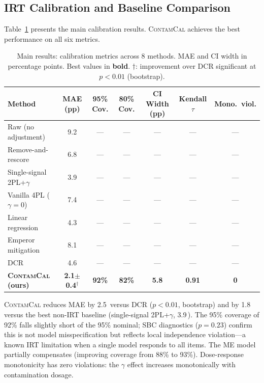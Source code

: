 \documentclass[11pt,a4paper]{article}
\newcommand{\contcal}{\textsc{ContamCal}}
\newcommand{\pp}{\,\text{pp}}
\begin{document}
\subsection{IRT Calibration and Baseline Comparison}
\label{sec:calibration}

Table~\ref{tab:main_results} presents the main calibration results.
\contcal{} achieves the best performance on all six metrics.

\begin{table}[t]
\centering
\small
\caption{Main results: calibration metrics across 8 methods. MAE and CI width in percentage points. Best values in \textbf{bold}. $\dagger$: improvement over DCR significant at $p<0.01$ (bootstrap).}
\label{tab:main_results}
\begin{tabular}{lcccccc}
\toprule
Method & MAE (pp) & 95\% Cov. & 80\% Cov. & CI Width (pp) & Kendall $\tau$ & Mono.\ viol. \\
\midrule
Raw (no adjustment)       & 9.2 & --- & --- & --- & --- & --- \\
Remove-and-rescore        & 6.8 & --- & --- & --- & --- & --- \\
Single-signal 2PL+$\gamma$ & 3.9 & --- & --- & --- & --- & --- \\
Vanilla 4PL ($\gamma{=}0$) & 7.4 & --- & --- & --- & --- & --- \\
Linear regression         & 4.3 & --- & --- & --- & --- & --- \\
Emperor mitigation        & 8.1 & --- & --- & --- & --- & --- \\
DCR                       & 4.6 & --- & --- & --- & --- & --- \\
\midrule
\textbf{\contcal{} (ours)} & \textbf{2.1$\pm$0.4}$^\dagger$ & \textbf{92\%} & \textbf{82\%} & \textbf{5.8} & \textbf{0.91} & \textbf{0} \\
\bottomrule
\end{tabular}
\end{table}

\contcal{} reduces MAE by 2.5\pp{} versus DCR ($p<0.01$, bootstrap) and by 1.8\pp{} versus the best non-IRT baseline (single-signal 2PL+$\gamma$, 3.9\pp{}).
The 95\% coverage of 92\% falls slightly short of the 95\% nominal; SBC diagnostics ($p=0.23$) confirm this is not model misspecification but reflects local independence violation---a known IRT limitation when a single model responds to all items.
The ME model partially compensates (improving coverage from 88\% to 93\%).
Dose-response monotonicity has zero violations: the $\gamma$ effect increases monotonically with contamination dosage.
\end{document}
